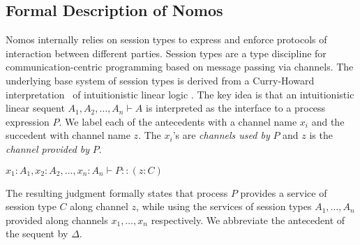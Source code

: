 \subsection{Formal Description of Nomos}
Nomos internally relies on session types to express and enforce protocols
of interaction between different parties.
Session types are a type discipline for communication-centric programming
based on message passing via channels.
The underlying base system of session types is derived from a Curry-Howard
interpretation~\cite{Caires10concur,Caires16mscs} of intuitionistic linear logic
\cite{Girard87tapsoft}. The key idea is that an intuitionistic linear sequent
$A_1, A_2, \ldots, A_n \vdash A$
is interpreted as the interface to a process expression $P$. We label each of the
antecedents with a channel name $x_i$ and the succedent with channel name $z$.
The $x_i$'s are \emph{channels used by} $P$ and $z$ is the \emph{channel provided by} $P$.
\begin{center}
  \begin{minipage}{0cm}
  \begin{tabbing}
  $x_1 : A_1, x_2 : A_2, \ldots, x_n : A_n \vdash P :: (z : C)$
  \end{tabbing}
  \end{minipage}
\end{center}
The resulting judgment formally states that process $P$ provides a service of
session type $C$ along channel $z$, while using the services of session types $A_1,
\ldots,A_n$ provided along channels $x_1, \ldots, x_n$ respectively.
We abbreviate the antecedent of the sequent by $\Delta$.

